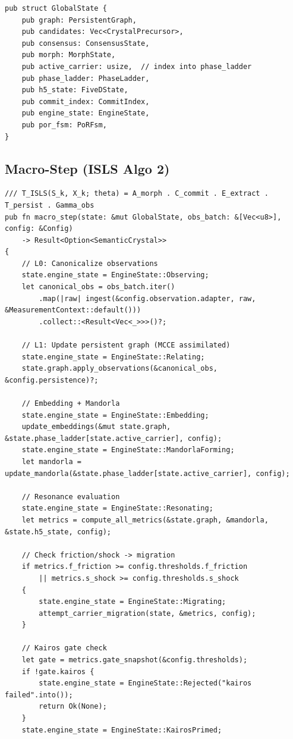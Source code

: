 \documentclass[10pt,a4paper]{article}
\theoremstyle{definition}\newtheorem{definition}{Def}[section]
\theoremstyle{plain}\newtheorem{theorem}{Thm}[section]
\begin{document}
\begin{lstlisting}[style=rust]
pub struct GlobalState {
    pub graph: PersistentGraph,
    pub candidates: Vec<CrystalPrecursor>,
    pub consensus: ConsensusState,
    pub morph: MorphState,
    pub active_carrier: usize,  // index into phase_ladder
    pub phase_ladder: PhaseLadder,
    pub h5_state: FiveDState,
    pub commit_index: CommitIndex,
    pub engine_state: EngineState,
    pub por_fsm: PoRFsm,
}
\end{lstlisting}

\subsection{Macro-Step (ISLS Algo 2)}

\begin{lstlisting}[style=rust]
/// T_ISLS(S_k, X_k; theta) = A_morph . C_commit . E_extract . T_persist . Gamma_obs
pub fn macro_step(state: &mut GlobalState, obs_batch: &[Vec<u8>], config: &Config)
    -> Result<Option<SemanticCrystal>>
{
    // L0: Canonicalize observations
    state.engine_state = EngineState::Observing;
    let canonical_obs = obs_batch.iter()
        .map(|raw| ingest(&config.observation.adapter, raw, &MeasurementContext::default()))
        .collect::<Result<Vec<_>>>()?;

    // L1: Update persistent graph (MCCE assimilated)
    state.engine_state = EngineState::Relating;
    state.graph.apply_observations(&canonical_obs, &config.persistence)?;

    // Embedding + Mandorla
    state.engine_state = EngineState::Embedding;
    update_embeddings(&mut state.graph, &state.phase_ladder[state.active_carrier], config);
    state.engine_state = EngineState::MandorlaForming;
    let mandorla = update_mandorla(&state.phase_ladder[state.active_carrier], config);

    // Resonance evaluation
    state.engine_state = EngineState::Resonating;
    let metrics = compute_all_metrics(&state.graph, &mandorla, &state.h5_state, config);

    // Check friction/shock -> migration
    if metrics.f_friction >= config.thresholds.f_friction
        || metrics.s_shock >= config.thresholds.s_shock
    {
        state.engine_state = EngineState::Migrating;
        attempt_carrier_migration(state, &metrics, config);
    }

    // Kairos gate check
    let gate = metrics.gate_snapshot(&config.thresholds);
    if !gate.kairos {
        state.engine_state = EngineState::Rejected("kairos failed".into());
        return Ok(None);
    }
    state.engine_state = EngineState::KairosPrimed;


\end{lstlisting}
\end{document}
